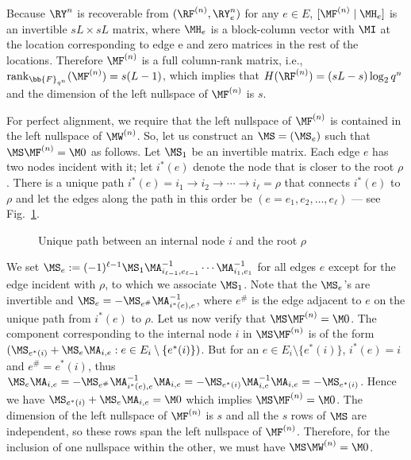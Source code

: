 Because $\RY^n$ is recoverable from $(\RF^{(n)},  \RY_e^n)$ for any $e \in E$, $[\MF^{(n)} \mid \MH_e]$ is an invertible $sL \times sL$ matrix, where $\MH_e$ is a block-column vector with $\MI$ at the location corresponding to edge e and zero matrices in the rest of the locations. Therefore $\MF^{(n)}$ is a full column-rank matrix, i.e., $\rank_{\bb{F}_{q^n}}(\MF^{(n)})= s(L-1)$, which implies that $H( \RF^{(n)}) =\left(sL - s\right) \log_2q^n$ and  the dimension of the left nullspace of $\MF^{(n)}$ is $s$.

For perfect alignment, we require that the left nullspace of $\MF^{(n)}$ is contained in  the left nullspace of $\MW^{(n)}$. So, let us construct an $\MS = (\MS_e)$ such that  $ \MS\MF^{(n)}=\M0$ as follows. Let $\MS_1$ be an invertible matrix. Each edge $e$ has two nodes incident with it; let $i^*(e)$ denote the node that is closer to the root $\rho$. There is a unique path $i^*(e) = i_1 \longrightarrow i_2 \longrightarrow  \cdots \longrightarrow i_{\ell} = \rho$ that connects $i^*(e)$ to $\rho$ and let the edges along the path in this order be $(e=e_1, e_2,\ldots, e_{\ell})$ --- see Fig.~\ref{fig:uniquepath}.
 \begin{figure}[h]
\centering
\resizebox{\totalheight}{!}{}
\caption{Unique path between an internal node $i$ and the root $\rho$}
\label{fig:uniquepath}
 \end{figure}
We set $\MS_e := (-1)^{\ell-1} \MS_1 \MA^{-1}_{i_{\ell -1}, e_{\ell-1}} \cdots \MA^{-1}_{i_{1}, e_{1}} $ for all edges $e$ except for the edge incident with $\rho$, to which we associate $\MS_1$. Note that the $\MS_e$'s are invertible and $\MS_e= - \MS_{e^{\#}}\MA^{-1}_{i^*(e), e}$, where  $e^{\#}$ is the edge adjacent to $e$ on the unique path from $i^*(e)$ to $\rho$. Let us now verify that $\MS \MF^{(n)} = \M0$. The  component corresponding to the internal node $i$ in $\MS \MF^{(n)}$ is of the form $(\MS_{e^*(i)} + \MS_{e}\MA_{i,e}: e \in E_i \setminus \{e^*(i)\})$. But for an  $e \in E_i \setminus \{e^*(i)\}$, $i^{*}(e) = i$ and $e^{\#} = e^*(i)$, thus $\MS_{e}\MA_{i,e} = - \MS_{e^{\#}}\MA^{-1}_{i^*(e), e}\MA_{i,e}= - \MS_{e^*(i)}\MA^{-1}_{i, e}\MA_{i,e} =- \MS_{e^*(i)}$. Hence we have  $\MS_{e^*(i)} + \MS_{e}\MA_{i,e}=\M0$ which implies $\MS \MF^{(n)} = \M0$.
The dimension of the left nullspace of $\MF^{(n)}$ is $s$ and all the $s$ rows of $\MS$ are independent,  so these rows span the left nullspace of $\MF^{(n)}$. Therefore, for the inclusion of one nullspace within the other, we must have $\MS\MW^{(n)} =\M0$.

